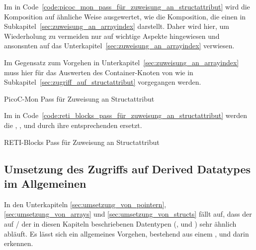 Im  in Code~\ref{code:picoc_mon_pass_für_zuweisung_an_structattribut} wird die Komposition  auf ähnliche Weise ausgewertet, wie die Komposition, die einen   in Subkapitel~\ref{sec:zuweisung_an_arrayindex} darstellt. Daher wird hier, um Wiederholung zu vermeiden nur auf wichtige Aspekte hingewiesen und ansonsnten auf das Unterkapitel~\ref{sec:zuweisung_an_arrayindex} verwiesen.

Im Gegensatz zum Vorgehen in Unterkapitel~\ref{sec:zuweisung_an_arrayindex} muss hier für das Auswerten des  Container-Knoten  von  wie in Subkapitel~\ref{sec:zugriff_auf_structattribut} vorgegangen werden.

\begin{code}
  \centering
  \caption{PicoC-Mon Pass für Zuweisung an Structattribut}
  \label{code:picoc_mon_pass_für_zuweisung_an_structattribut}
\end{code}

Im  in Code~\ref{code:reti_blocks_pass_für_zuweisung_an_structattribut} werden die  , ,  und  durch ihre entsprechenden  ersetzt.

\begin{code}
  \centering
  \caption{RETI-Blocks Pass für Zuweisung an Structattribut}
  \label{code:reti_blocks_pass_für_zuweisung_an_structattribut}
\end{code}

\subsection{Umsetzung des Zugriffs auf Derived Datatypes im Allgemeinen}
In den Unterkapiteln \ref{sec:umsetzung_von_pointern}, \ref{sec:umsetzung_von_arrays} und \ref{sec:umsetzung_von_structs} fällt auf, dass der  auf  /  der in diesen Kapiteln beschriebenen Datentypen (,  und ) sehr ähnlich abläuft. Es lässt sich ein allgemeines Vorgehen, bestehend aus einem ,  und  darin erkennen.


